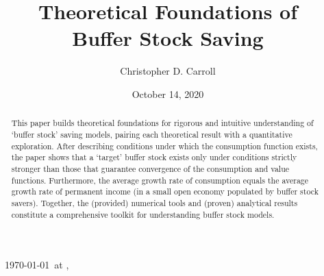 \documentclass[BufferStockTheory]{subfiles}
\begin{document}
\providecommand{\versn}{} %
\ifthenelse{\boolean{ifWeb}}{  \renewcommand{\underline}{\underline}\renewcommand{\versn}{Web} }{} %


\hfill{\tiny \jobname~\versn~\today~{at} \DTMcurrenttime, ~~}

\title{Theoretical Foundations of \\ Buffer Stock Saving}

\author{Christopher D. Carroll\authNum}



\renewcommand{\forcedate}{October 14, 2020}
\date{\forcedate}

\maketitle 
\hypertarget{abstract}{}
\begin{abstract}
  This paper builds theoretical foundations for rigorous and intuitive understanding of `buffer stock' saving models, pairing each theoretical result with a quantitative exploration.  After describing conditions under which the consumption function exists, the paper shows that a `target' buffer stock exists only under conditions strictly stronger than those that guarantee convergence of the consumption and value functions.  Furthermore, the average growth rate of consumption equals the average growth rate of permanent income (in a small open economy populated by buffer stock savers).  Together, the (provided) numerical tools and (proven) analytical results constitute a comprehensive toolkit for understanding buffer stock models.
\end{abstract}
\end{document}
